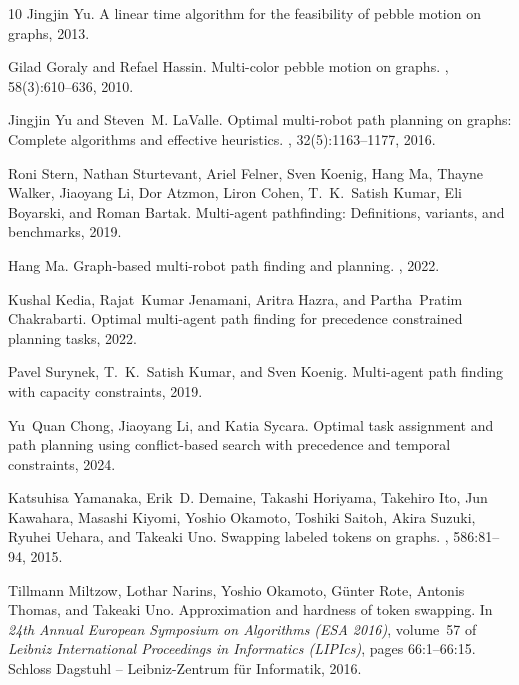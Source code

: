 \documentclass[a4paper,USenglish,thm-restate]{lipics-v2021}
\theoremstyle{problemstyle}
\begin{document}
\begin{thebibliography}{10}
Jingjin Yu.
\newblock A linear time algorithm for the feasibility of pebble motion on
  graphs, 2013.

Gilad Goraly and Refael Hassin.
\newblock Multi-color pebble motion on graphs.
, 58(3):610--636, 2010.

Jingjin Yu and Steven~M. LaValle.
\newblock Optimal multi-robot path planning on graphs: Complete algorithms and
  effective heuristics.
, 32(5):1163--1177, 2016.

Roni Stern, Nathan Sturtevant, Ariel Felner, Sven Koenig, Hang Ma, Thayne
  Walker, Jiaoyang Li, Dor Atzmon, Liron Cohen, T.~K.~Satish Kumar, Eli
  Boyarski, and Roman Bartak.
\newblock Multi-agent pathfinding: Definitions, variants, and benchmarks, 2019.

Hang Ma.
\newblock Graph-based multi-robot path finding and planning.
, 2022.

Kushal Kedia, Rajat~Kumar Jenamani, Aritra Hazra, and Partha~Pratim
  Chakrabarti.
\newblock Optimal multi-agent path finding for precedence constrained planning
  tasks, 2022.

Pavel Surynek, T.~K.~Satish Kumar, and Sven Koenig.
\newblock Multi-agent path finding with capacity constraints, 2019.

Yu~Quan Chong, Jiaoyang Li, and Katia Sycara.
\newblock Optimal task assignment and path planning using conflict-based search
  with precedence and temporal constraints, 2024.

Katsuhisa Yamanaka, Erik~D. Demaine, Takashi Horiyama, Takehiro Ito, Jun
  Kawahara, Masashi Kiyomi, Yoshio Okamoto, Toshiki Saitoh, Akira Suzuki,
  Ryuhei Uehara, and Takeaki Uno.
\newblock Swapping labeled tokens on graphs.
, 586:81--94, 2015.

Tillmann Miltzow, Lothar Narins, Yoshio Okamoto, G{\"u}nter Rote, Antonis
  Thomas, and Takeaki Uno.
\newblock Approximation and hardness of token swapping.
\newblock In {\em 24th Annual European Symposium on Algorithms (ESA 2016)},
  volume~57 of {\em Leibniz International Proceedings in Informatics (LIPIcs)},
  pages 66:1--66:15. Schloss Dagstuhl -- Leibniz-Zentrum f{\"u}r Informatik,
  2016.


\end{thebibliography}
\end{document}

